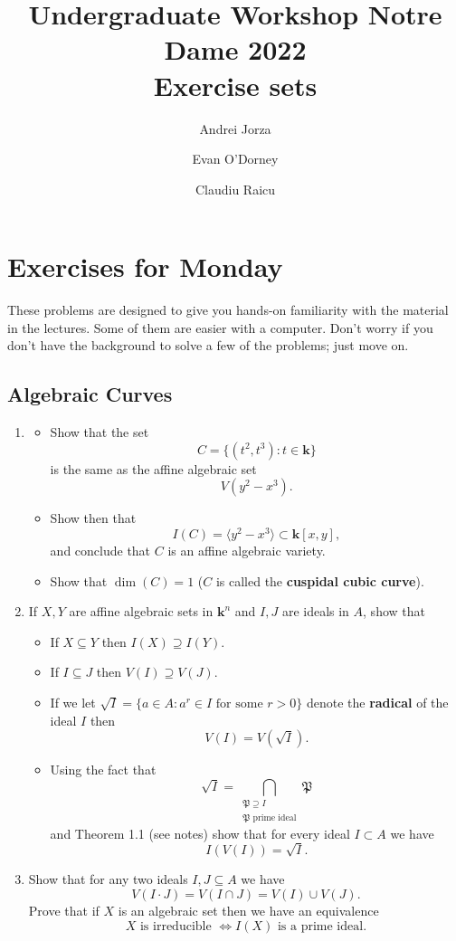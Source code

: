 \documentclass{article}
\title{Undergraduate Workshop Notre Dame 2022\\Exercise sets}
\author{Andrei Jorza\and Evan O'Dorney\and Claudiu Raicu}
\date{}
\theoremstyle{plain} %
\theoremstyle{definition}
\theoremstyle{remark}
\numberwithin{equation}{section}
\renewcommand{\k}{{\mathbf k}}
\newcommand{\defi}[1]{{\bf\upshape\sffamily #1}}
\newcommand{\mf}[1]{\mathfrak{#1}}
\begin{document}
\maketitle

\section{Exercises for Monday}
These problems are designed to give you hands-on familiarity with the material in the lectures. Some of them are easier with a computer. Don't worry if you don't have the background to solve a few of the problems; just move on.
\subsection{Algebraic Curves}
\begin{enumerate}
 \item\label{ex-varieties:1} \begin{itemize}
 \item Show that the set
 \[ C = \{ (t^2,t^3) : t\in \k \}\]
 is the same as the affine algebraic set
 \[ V(y^2-x^3).\]
 \item Show then that
 \[ I(C) = \langle y^2-x^3 \rangle \subset \k[x,y],\]
 and conclude that $C$ is an affine algebraic variety.
 \item Show that $\dim(C)=1$ ($C$ is called the \defi{cuspidal cubic curve}).
 \end{itemize}
 \item\label{ex-varieties:1} If $X,Y$ are affine algebraic sets in $\k^n$ and $I,J$ are ideals in $A$, show that
 \begin{itemize}
  \item If $X\subseteq Y$ then $I(X) \supseteq I(Y)$.
  \item If $I \subseteq J$ then $V(I) \supseteq V(J)$.
  \item If we let $\sqrt{I} = \{ a\in A : a^r\in I\mbox{ for some }r>0\}$ denote the \defi{radical} of the ideal $I$ then
  \[V(I) = V(\sqrt{I}).\]
  \item Using the fact that \[\sqrt{I} = \bigcap_{\substack{\mf{P}\supseteq I \\ \mf{P}\mbox{ prime ideal}}} \mf{P}\] and Theorem 1.1 (see notes) show that for every ideal $I\subset A$ we have
  \[ I(V(I)) = \sqrt{I}.\]
 \end{itemize}
 \item\label{ex-varieties:2} Show that for any two ideals $I,J\subseteq A$ we have
 \[ V(I\cdot J) = V(I \cap J) = V(I) \cup V(J).\]
 Prove that if $X$ is an algebraic set then we have an equivalence
 \[X \mbox{ is irreducible }\Longleftrightarrow I(X)\mbox{ is a prime ideal}.\]


\end{enumerate}
\end{document}

